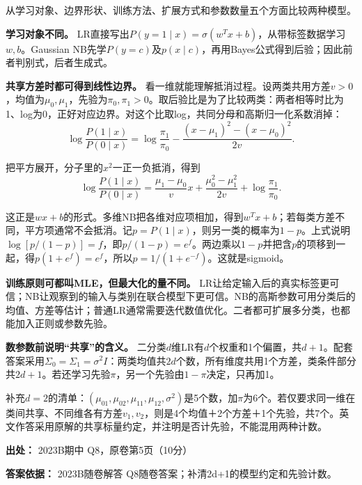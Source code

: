 从学习对象、边界形状、训练方法、扩展方式和参数数量五个方面比较两种模型。


\textbf{学习对象不同。} LR直接写出\(P(y=1\mid x)=\sigma(w^Tx+b)\)，从带标签数据学习\(w,b\)。Gaussian NB先学\(P(y=c)\)及\(p(x\mid c)\)，再用Bayes公式得到后验；因此前者判别式，后者生成式。


\textbf{共享方差时都可得到线性边界。} 看一维就能理解抵消过程。设两类共用方差\(v>0\)，均值为\(\mu_0,\mu_1\)，先验为\(\pi_0,\pi_1>0\)。取后验比是为了比较两类：两者相等时比为1、log为0，正好对应边界。对这个比取log，共同分母和高斯归一化系数消掉：
\[
\log\frac{P(1\mid x)}{P(0\mid x)}
=\log\frac{\pi_1}{\pi_0}-\frac{(x-\mu_1)^2-(x-\mu_0)^2}{2v}.
\]


把平方展开，分子里的\(x^2\)一正一负抵消，得到
\[
\log\frac{P(1\mid x)}{P(0\mid x)}
=\frac{\mu_1-\mu_0}{v}x+\frac{\mu_0^2-\mu_1^2}{2v}+\log\frac{\pi_1}{\pi_0}.
\]


这正是\(wx+b\)的形式。多维NB把各维对应项相加，得到\(w^Tx+b\)；若每类方差不同，平方项通常不会抵消。记\(p=P(1\mid x)\)，则另一类的概率为\(1-p\)。上式说明\(\log[p/(1-p)]=f\)，即\(p/(1-p)=e^f\)。两边乘以\(1-p\)并把含\(p\)的项移到一起，得\(p(1+e^f)=e^f\)，所以\(p=1/(1+e^{-f})\)。这就是sigmoid。


\textbf{训练原则可都叫MLE，但最大化的量不同。} LR让给定输入后的真实标签更可信；NB让观察到的输入与类别在联合模型下更可信。NB的高斯参数可用分类后的均值、方差等估计；普通LR通常需要迭代数值优化。二者都可扩展多分类，也都能加入正则或参数先验。


\textbf{数参数前说明“共享”的含义。} 二分类\(d\)维LR有\(d\)个权重和1个偏置，共\(d+1\)。配套答案采用\(\Sigma_0=\Sigma_1=\sigma^2I\)：两类均值共\(2d\)个数，所有维度共用1个方差，类条件部分共\(2d+1\)。若还学习先验\(\pi\)，另一个先验由\(1-\pi\)决定，只再加1。


补充\(d=2\)的清单：\((\mu_{01},\mu_{02},\mu_{11},\mu_{12},\sigma^2)\)是5个数，加\(\pi\)为6个。若仅要求同一维在类间共享、不同维各有方差\(v_1,v_2\)，则是4个均值＋2个方差＋1个先验，共7个。英文作答采用原解的共享标量约定，并注明是否计先验，不能混用两种计数。


\textbf{出处：} 2023B期中 Q8，原卷第5页（10分）


\textbf{答案依据：} 2023B随卷解答 Q8随卷答案；补清2d+1的模型约定和先验计数。
